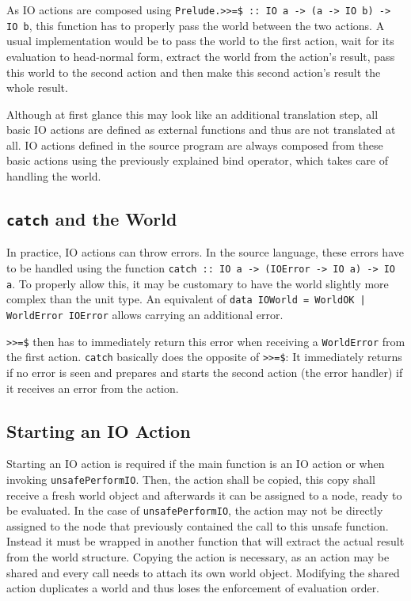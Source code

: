 As IO actions are composed using \texttt{Prelude.>{}>=\$ :: IO a -> (a -> IO b) -> IO b}, this function has to properly pass the world between the two actions.
A usual implementation would be to pass the world to the first action, wait for its evaluation to head-normal form, extract the world from the action's result, pass this world to the second action and then make this second action's result the whole result.

Although at first glance this may look like an additional translation step, all basic IO actions are defined as external functions and thus are not translated at all.
IO actions defined in the source program are always composed from these basic actions using the previously explained bind operator, which takes care of handling the world.

\subsection{\texttt{catch} and the World}

In practice, IO actions can throw errors.
In the source language, these errors have to be handled using the function \texttt{catch :: IO a -> (IOError -> IO a) -> IO a}.
To properly allow this, it may be customary to have the world slightly more complex than the unit type.
An equivalent of \texttt{data IOWorld = WorldOK | WorldError IOError} allows carrying an additional error.

\texttt{>{}>=\$} then has to immediately return this error when receiving a \texttt{WorldError} from the first action.
\texttt{catch} basically does the opposite of \texttt{>{}>=\$}:
It immediately returns if no error is seen and prepares and starts the second action (the error handler) if it receives an error from the action.

\subsection{Starting an IO Action}

Starting an IO action is required if the main function is an IO action or when invoking \texttt{unsafePerformIO}.
Then, the action shall be copied, this copy shall receive a fresh world object and afterwards it can be assigned to a node, ready to be evaluated.
In the case of \texttt{unsafePerformIO}, the action may not be directly assigned to the node that previously contained the call to this unsafe function.
Instead it must be wrapped in another function that will extract the actual result from the world structure.
Copying the action is necessary, as an action may be shared and every call needs to attach its own world object.
Modifying the shared action duplicates a world and thus loses the enforcement of evaluation order.

